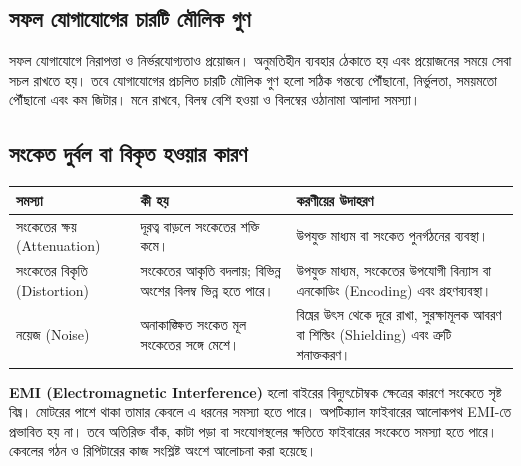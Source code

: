 \subsection{সফল যোগাযোগের চারটি মৌলিক গুণ}
\label{ch2:c01-06}
সফল যোগাযোগে নিরাপত্তা ও নির্ভরযোগ্যতাও প্রয়োজন। অনুমতিহীন ব্যবহার ঠেকাতে হয় এবং প্রয়োজনের সময়ে সেবা সচল রাখতে হয়। তবে যোগাযোগের প্রচলিত চারটি মৌলিক গুণ হলো সঠিক গন্তব্যে পৌঁছানো, নির্ভুলতা, সময়মতো পৌঁছানো এবং কম জিটার। মনে রাখবে, বিলম্ব বেশি হওয়া ও বিলম্বের ওঠানামা আলাদা সমস্যা।

\subsection{সংকেত দুর্বল বা বিকৃত হওয়ার কারণ}
\label{ch2:c01-07}
\begin{tabularx}{\linewidth}{|p{.20\linewidth}|X|X|}
\hline
\textbf{সমস্যা} & \textbf{কী হয়} & \textbf{করণীয়ের উদাহরণ}\\\hline
সংকেতের ক্ষয় (Attenuation) & দূরত্ব বাড়লে সংকেতের শক্তি কমে। & উপযুক্ত মাধ্যম বা সংকেত পুনর্গঠনের ব্যবস্থা।\\\hline
সংকেতের বিকৃতি (Distortion) & সংকেতের আকৃতি বদলায়; বিভিন্ন অংশের বিলম্ব ভিন্ন হতে পারে। & উপযুক্ত মাধ্যম, সংকেতের উপযোগী বিন্যাস বা এনকোডিং (Encoding) এবং গ্রহণব্যবস্থা।\\\hline
নয়েজ (Noise) & অনাকাঙ্ক্ষিত সংকেত মূল সংকেতের সঙ্গে মেশে। & বিঘ্নের উৎস থেকে দূরে রাখা, সুরক্ষামূলক আবরণ বা শিল্ডিং (Shielding) এবং ত্রুটি শনাক্তকরণ।\\\hline
\end{tabularx}
\textbf{EMI (Electromagnetic Interference)} হলো বাইরের বিদ্যুৎচৌম্বক ক্ষেত্রের কারণে সংকেতে সৃষ্ট বিঘ্ন। মোটরের পাশে থাকা তামার কেবলে এ ধরনের সমস্যা হতে পারে। অপটিক্যাল ফাইবারের আলোকপথ EMI-তে প্রভাবিত হয় না। তবে অতিরিক্ত বাঁক, কাটা পড়া বা সংযোগস্থলের ক্ষতিতে ফাইবারের সংকেতে সমস্যা হতে পারে। কেবলের গঠন ও রিপিটারের কাজ সংশ্লিষ্ট অংশে আলোচনা করা হয়েছে।

